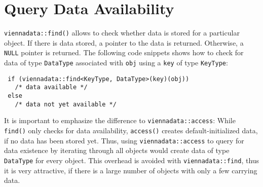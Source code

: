 \section{Query Data Availability}
\lstinline|viennadata::find()| allows to check whether data is stored for a particular object. If there is data stored, a pointer to the data is returned. Otherwise, a \lstinline|NULL| pointer is returned.
The following code snippets shows how to check for data of type \lstinline|DataType| associated with \lstinline|obj| using a \lstinline|key| of type \lstinline|KeyType|:
\begin{lstlisting}
 if (viennadata::find<KeyType, DataType>(key)(obj))
   /* data available */
 else
   /* data not yet available */
\end{lstlisting}

It is important to emphasize the difference to \lstinline|viennadata::access|: While \lstinline|find()| only checks for data availability, \lstinline|access()| creates default-initialized data, if no data has been stored yet. Thus, using \lstinline|viennadata::access| to query for data existence by iterating through all objects would create data of type \lstinline|DataType| for every object. This overhead is avoided with \lstinline|viennadata::find|, thus it is very attractive, if there is a large number of objects with only a few carrying data.

